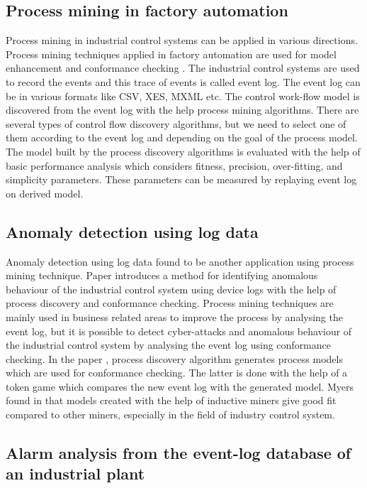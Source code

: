 \documentclass[conference]{IEEEtran}
\begin{document}
\subsection{Process mining in factory automation}
Process mining in industrial control systems can be applied in various directions. Process mining techniques applied in factory automation are used for model enhancement and conformance checking \cite{paper1}. The industrial control systems are used to record the events and this trace of events is called event log. The  event log can be in various formats like CSV, XES, MXML etc. The control work-flow model is discovered from the event log with the help process mining algorithms. There are several types of control flow discovery algorithms, but we need to select one of them according to the event log and depending on the goal of the process model. The model built by the process discovery algorithms is evaluated with the help of basic performance analysis which considers fitness, precision, over-fitting, and simplicity parameters. These parameters can be measured by replaying event log on derived model.

\subsection{Anomaly detection using log data}

Anomaly detection using log data found to be another application using process mining technique. Paper \cite{paper2} introduces a method for identifying anomalous behaviour of the industrial control system using device logs with the help of process discovery and conformance checking. Process mining techniques are mainly used in business related areas to improve the process by analysing the event log, but it is possible to detect cyber-attacks and anomalous behaviour of the industrial control system by analysing the event log using conformance checking. In the paper \cite{paper2}, process discovery algorithm generates process models which are used for conformance checking. The latter is done with the help of a token game which compares the new event log with the generated model. Myers found in \cite{paper3} that models created with the help of inductive miners give good fit compared to other miners, especially in the field of industry control system.

\subsection{ Alarm analysis from the event-log database of an industrial plant}
\end{document}
